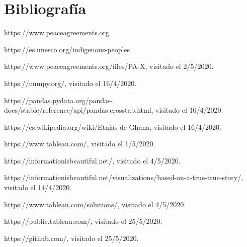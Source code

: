 \documentclass[11pt]{article}
\begin{document}
\pagebreak

\section{Bibliografía}

\begin{thebibliography}{X}
https://www.peaceagreements.org

 https://es.unesco.org/indigenous-peoples

 https://www.peaceagreements.org/files/PA-X, visitado el 2/5/2020.

 https://numpy.org/, visitado el 16/4/2020.

 https://pandas.pydata.org/pandas-docs/stable/reference/api/pandas.crosstab.html, visitado el 16/4/2020.

 https://es.wikipedia.org/wiki/Etnias-de-Ghana, visitado el 16/4/2020.

 https://www.tableau.com/, visitado el 1/5/2020.

 https://informationisbeautiful.net/, visitado el 4/5/2020.

 https://informationisbeautiful.net/visualizations/based-on-a-true-true-story/, visitado el 14/4/2020.


 https://www.tableau.com/solutions/, visitado el 4/5/2020.

 https://public.tableau.com/, visitado el 25/5/2020.

 https://github.com/, visitado el 25/5/2020.

\end{thebibliography}
\end{document}
